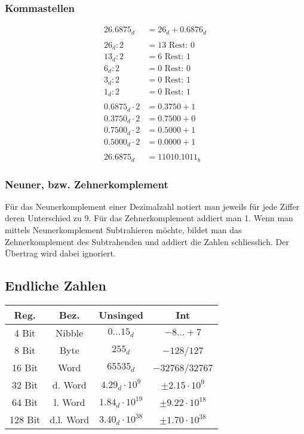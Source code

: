 \begin{minipage}[t]{0.45\linewidth}
\subsubsection*{Kommastellen}
	\begin{align*}
		26.6875_d &= 26_d + 0.6876_d \\
		\\
		26_d : 2 &= 13 \text{ Rest: } 0 \\
		13_d : 2 &= 6 \text{ Rest: } 1 \\
		6_d : 2 &= 0 \text{ Rest: } 0 \\
		3_d : 2 &= 0 \text{ Rest: } 1 \\
		1_d : 2 &= 0 \text{ Rest: } 1 \\
		\\
		0.6875_d \cdot 2 &= 0.3750 + 1 \\
		0.3750_d \cdot 2 &= 0.7500 + 0 \\
		0.7500_d \cdot 2 &= 0.5000 + 1 \\
		0.5000_d \cdot 2 &= 0.0000 + 1 \\
		\\
		26.6875_d &= 11010.1011_b
	\end{align*}
\end{minipage}
\subsubsection{Neuner, bzw. Zehnerkomplement}%
\label{ssub:neuner_bzw_zehnerkomplement}
Für das Neunerkomplement einer Dezimalzahl notiert man jeweils für jede Ziffer deren Unterschied zu 9. Für das Zehnerkomplement addiert man 1. Wenn man mittels Neunerkomplement Subtrahieren möchte, bildet man das Zehnerkomplement des Subtrahenden und addiert die Zahlen schliesslich. Der Übertrag wird dabei ignoriert.


\subsection{Endliche Zahlen}
\begin{tabular}{| c | c | c | c |}
	\hline
	Reg. & Bez. & Unsinged & Int \\
	\hline
	\hline
	4 Bit & Nibble & $0 ... 15_d$ & $-8 ... +7$ \\
	\hline
	8 Bit & Byte & $255_d$ & $-128$/$127$ \\
	\hline
	16 Bit & Word & $65535_d$ & $-32768$/$32767$ \\
	\hline
	32 Bit & d. Word & $4.29_d \cdot 10^9$ & $\pm 2.15 \cdot 10^9$ \\
	\hline
	64 Bit & l. Word & $1.84_d \cdot 10^{19}$ & $\pm 9.22 \cdot 10^{18}$ \\
	\hline
	128 Bit & d.l. Word & $3.40_d \cdot 10^{38}$ & $\pm 1.70 \cdot 10^{38}$ \\
	\hline
\end{tabular}

